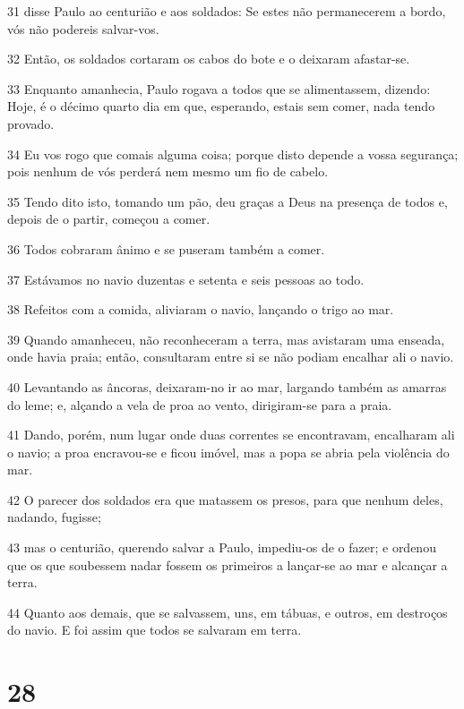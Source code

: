 \par 31 disse Paulo ao centurião e aos soldados: Se estes não permanecerem a bordo, vós não podereis salvar-vos.
\par 32 Então, os soldados cortaram os cabos do bote e o deixaram afastar-se.
\par 33 Enquanto amanhecia, Paulo rogava a todos que se alimentassem, dizendo: Hoje, é o décimo quarto dia em que, esperando, estais sem comer, nada tendo provado.
\par 34 Eu vos rogo que comais alguma coisa; porque disto depende a vossa segurança; pois nenhum de vós perderá nem mesmo um fio de cabelo.
\par 35 Tendo dito isto, tomando um pão, deu graças a Deus na presença de todos e, depois de o partir, começou a comer.
\par 36 Todos cobraram ânimo e se puseram também a comer.
\par 37 Estávamos no navio duzentas e setenta e seis pessoas ao todo.
\par 38 Refeitos com a comida, aliviaram o navio, lançando o trigo ao mar.
\par 39 Quando amanheceu, não reconheceram a terra, mas avistaram uma enseada, onde havia praia; então, consultaram entre si se não podiam encalhar ali o navio.
\par 40 Levantando as âncoras, deixaram-no ir ao mar, largando também as amarras do leme; e, alçando a vela de proa ao vento, dirigiram-se para a praia.
\par 41 Dando, porém, num lugar onde duas correntes se encontravam, encalharam ali o navio; a proa encravou-se e ficou imóvel, mas a popa se abria pela violência do mar.
\par 42 O parecer dos soldados era que matassem os presos, para que nenhum deles, nadando, fugisse;
\par 43 mas o centurião, querendo salvar a Paulo, impediu-os de o fazer; e ordenou que os que soubessem nadar fossem os primeiros a lançar-se ao mar e alcançar a terra.
\par 44 Quanto aos demais, que se salvassem, uns, em tábuas, e outros, em destroços do navio. E foi assim que todos se salvaram em terra.

\chapter{28}


